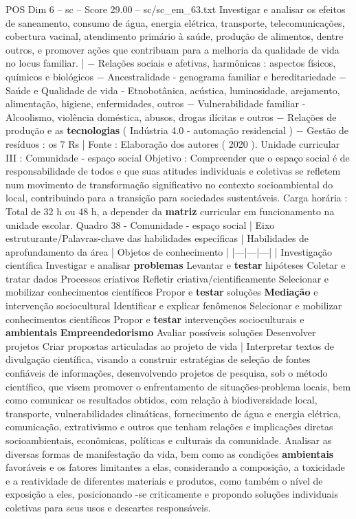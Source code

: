 \begin{textsample}{POS Dim 6 – sc – Score 29.00 – sc/sc\_em\_63.txt}
Investigar e analisar os efeitos de saneamento, consumo de água, energia elétrica, transporte, telecomunicações, cobertura vacinal, atendimento primário à saúde, produção de alimentos, dentre outros, e promover ações que contribuam para a melhoria da qualidade de vida no locus familiar. | − Relações sociais e afetivas, harmônicas : aspectos físicos, químicos e biológicos − Ancestralidade - genograma familiar e hereditariedade − Saúde e Qualidade de vida - Etnobotânica, acústica, luminosidade, arejamento, alimentação, higiene, enfermidades, outros − Vulnerabilidade familiar - Alcoolismo, violência doméstica, abusos, drogas ilícitas e outros − Relações de produção e as \textbf{tecnologias} ( Indústria 4.0 - automação residencial ) − Gestão de resíduos : os 7 Rs | Fonte : Elaboração dos autores ( 2020 ).
Unidade curricular III : Comunidade - espaço social Objetivo : Compreender que o espaço social é de responsabilidade de todos e que suas atitudes individuais e coletivas se refletem num movimento de transformação significativo no contexto socioambiental do local, contribuindo para a transição para sociedades sustentáveis.
Carga horária : Total de 32 h ou 48 h, a depender da \textbf{matriz} curricular em funcionamento na unidade escolar.
Quadro 38 - Comunidade - espaço social | Eixo estruturante/Palavras-chave das habilidades específicas | Habilidades de aprofundamento da área | Objetos de conhecimento | |---|---|---| | Investigação científica Investigar e analisar \textbf{problemas} Levantar e \textbf{testar} hipóteses Coletar e tratar dados Processos criativos Refletir criativa/cientificamente Selecionar e mobilizar conhecimentos científicos Propor e \textbf{testar} soluções \textbf{Mediação} e intervenção sociocultural Identificar e explicar fenômenos Selecionar e mobilizar conhecimentos científicos Propor e \textbf{testar} intervenções socioculturais e \textbf{ambientais} \textbf{Empreendedorismo} Avaliar possíveis soluções Desenvolver projetos Criar propostas articuladas ao projeto de vida | Interpretar textos de divulgação científica, visando a construir estratégias de seleção de fontes confiáveis de informações, desenvolvendo projetos de pesquisa, sob o método científico, que visem promover o enfrentamento de situações-problema locais, bem como comunicar os resultados obtidos, com relação à biodiversidade local, transporte, vulnerabilidades climáticas, fornecimento de água e energia elétrica, comunicação, extrativismo e outros que tenham relações e implicações diretas socioambientais, econômicas, políticas e culturais da comunidade.
Analisar as diversas formas de manifestação da vida, bem como as condições \textbf{ambientais} favoráveis e os fatores limitantes a elas, considerando a composição, a toxicidade e a reatividade de diferentes materiais e produtos, como também o nível de exposição a eles, posicionando -se criticamente e propondo soluções individuais coletivas para seus usos e descartes responsáveis.

\end{textsample}
